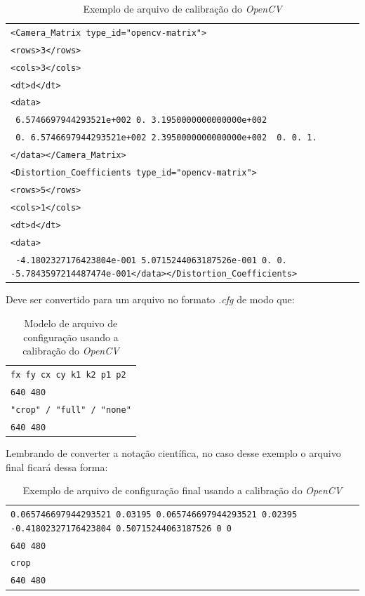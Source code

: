 \begin{table}[!ht]\label{tb:9}
\begin{tabular}{| p{\textwidth}|}
\hline
\texttt{<Camera\_Matrix type\_id="opencv-matrix">}\\
\texttt{<rows>3</rows>}\\
\texttt{<cols>3</cols>}\\
\texttt{<dt>d</dt>}\\
\texttt{<data>}\\
\texttt{ 6.5746697944293521e+002 0. 3.1950000000000000e+002}\\
\texttt{ 0. 6.5746697944293521e+002 2.3950000000000000e+002}\
\texttt{ 0. 0. 1.}\\
\texttt{</data></Camera\_Matrix>}\\
\texttt{<Distortion\_Coefficients type\_id="opencv-matrix">}\\
\texttt{<rows>5</rows>}\\
\texttt{<cols>1</cols>}\\
\texttt{<dt>d</dt>}\\
\texttt{<data>}\\
\texttt{ -4.1802327176423804e-001 5.0715244063187526e-001 0. 0. -5.7843597214487474e-001</data></Distortion\_Coefficients>}\\
 \hline
\end{tabular}
\caption{Exemplo de arquivo de calibração do \textit{OpenCV}}
\end{table}

Deve ser convertido para um arquivo no formato \textit{.cfg} de modo que:

\begin{table}[!ht]\label{tb:10}
\begin{tabular}{| p{\textwidth}|}
\hline
\texttt{fx fy cx cy k1 k2 p1 p2}\\
\texttt{640 480}\\
\texttt{"crop" / "full" / "none"}\\
\texttt{640 480}\\
 \hline
\end{tabular}
\caption{Modelo de arquivo de configuração usando a calibração do \textit{OpenCV}}
\end{table}

Lembrando de converter a notação científica, no caso desse exemplo o arquivo final ficará dessa forma:

\begin{table}[!ht]\label{tb:11}
\begin{tabular}{| p{\textwidth}|}
\hline
\texttt{0.065746697944293521 0.03195 0.065746697944293521 0.02395 -0.41802327176423804 0.50715244063187526 0 0}\\
\texttt{640 480}\\
\texttt{crop}\\
\texttt{640 480}\\
 \hline
\end{tabular}
\caption{Exemplo de arquivo de configuração final usando a calibração do \textit{OpenCV}}
\end{table}

